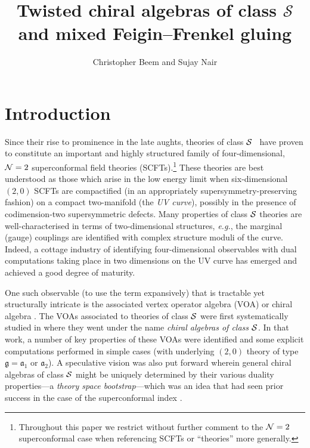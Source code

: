 \documentclass[a4paper]{article}
\title{Twisted chiral algebras of class \texorpdfstring{$\mathcal{S}$}{S} and mixed Feigin--Frenkel gluing}
\author{Christopher Beem and Sujay Nair}
\affiliation{Mathematical Institute, University of Oxford, Woodstock Road, Oxford, OX2 6GG, UK}
\def\NN{{\cal N}}
\def\SS{{\cal S}}
\def\af{\mathfrak{a}}
\def\gf{\mathfrak{g}}
\def \eg{{\it e.g.}}
\begin{document}
\maketitle
\flushbottom


\eject

\section{Introduction}
\label{sec:intro}

Since their rise to prominence in the late aughts, theories of class $\SS$~\cite{Gaiotto:2009we, Gaiotto:2009hg} have proven to constitute an important and highly structured family of four-dimensional, $\NN=2$ superconformal field theories (SCFTs).\footnote{Throughout this paper we restrict without further comment to the $\NN=2$ superconformal case when referencing SCFTs or ``theories'' more generally.} These theories are best understood as those which arise in the low energy limit when six-dimensional $(2,0)$ SCFTs are compactified (in an appropriately supersymmetry-preserving fashion) on a compact two-manifold (the \emph{UV curve}), possibly in the presence of codimension-two supersymmetric defects. Many properties of class $\SS$ theories are well-characterised in terms of two-dimensional structures, \eg, the marginal (gauge) couplings are identified with complex structure moduli of the curve. Indeed, a cottage industry of identifying four-dimensional observables with dual computations taking place in two dimensions on the UV curve has emerged and achieved a good degree of maturity.

One such observable (to use the term expansively) that is tractable yet structurally intricate is the associated vertex operator algebra (VOA) or chiral algebra \cite{Beem:2013sza}. The VOAs associated to theories of class $\SS$ were first systematically studied in \cite{Beem:2014rza} where they went under the name \emph{chiral algebras of class $\SS$}. In that work, a number of key properties of these VOAs were identified and some explicit computations performed in simple cases (with underlying $(2,0)$ theory of type $\gf=\af_1$ or $\af_2$). A speculative vision was also put forward wherein general chiral algebras of class $\SS$ might be uniquely determined by their various duality properties---a \emph{theory space bootstrap}---which was an idea that had seen prior success in the case of the superconformal index \cite{Gaiotto:2012xa}.
\end{document}
